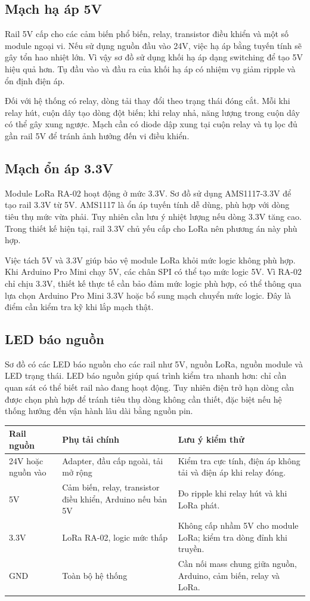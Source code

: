 \subsection{Mạch hạ áp 5V}
Rail 5V cấp cho các cảm biến phổ biến, relay, transistor điều khiển và một số module ngoại vi. Nếu sử dụng nguồn đầu vào 24V, việc hạ áp bằng tuyến tính sẽ gây tổn hao nhiệt lớn. Vì vậy sơ đồ sử dụng khối hạ áp dạng switching để tạo 5V hiệu quả hơn. Tụ đầu vào và đầu ra của khối hạ áp có nhiệm vụ giảm ripple và ổn định điện áp.

Đối với hệ thống có relay, dòng tải thay đổi theo trạng thái đóng cắt. Mỗi khi relay hút, cuộn dây tạo dòng đột biến; khi relay nhả, năng lượng trong cuộn dây có thể gây xung ngược. Mạch cần có diode dập xung tại cuộn relay và tụ lọc đủ gần rail 5V để tránh ảnh hưởng đến vi điều khiển.

\subsection{Mạch ổn áp 3.3V}
Module LoRa RA-02 hoạt động ở mức 3.3V. Sơ đồ sử dụng AMS1117-3.3V để tạo rail 3.3V từ 5V. AMS1117 là ổn áp tuyến tính dễ dùng, phù hợp với dòng tiêu thụ mức vừa phải. Tuy nhiên cần lưu ý nhiệt lượng nếu dòng 3.3V tăng cao. Trong thiết kế hiện tại, rail 3.3V chủ yếu cấp cho LoRa nên phương án này phù hợp.

Việc tách 5V và 3.3V giúp bảo vệ module LoRa khỏi mức logic không phù hợp. Khi Arduino Pro Mini chạy 5V, các chân SPI có thể tạo mức logic 5V. Vì RA-02 chỉ chịu 3.3V, thiết kế thực tế cần bảo đảm mức logic phù hợp, có thể thông qua lựa chọn Arduino Pro Mini 3.3V hoặc bổ sung mạch chuyển mức logic. Đây là điểm cần kiểm tra kỹ khi lắp mạch thật.

\subsection{LED báo nguồn}
Sơ đồ có các LED báo nguồn cho các rail như 5V, nguồn LoRa, nguồn module và LED trạng thái. LED báo nguồn giúp quá trình kiểm tra nhanh hơn: chỉ cần quan sát có thể biết rail nào đang hoạt động. Tuy nhiên điện trở hạn dòng cần được chọn phù hợp để tránh tiêu thụ dòng không cần thiết, đặc biệt nếu hệ thống hướng đến vận hành lâu dài bằng nguồn pin.

\begin{longtable}{|p{3cm}|p{4cm}|p{5.8cm}|}
\hline
\textbf{Rail nguồn} & \textbf{Phụ tải chính} & \textbf{Lưu ý kiểm thử} \\
\hline
24V hoặc nguồn vào & Adapter, đầu cấp ngoài, tải mở rộng & Kiểm tra cực tính, điện áp không tải và điện áp khi relay đóng. \\
\hline
5V & Cảm biến, relay, transistor điều khiển, Arduino nếu bản 5V & Đo ripple khi relay hút và khi LoRa phát. \\
\hline
3.3V & LoRa RA-02, logic mức thấp & Không cấp nhầm 5V cho module LoRa; kiểm tra dòng đỉnh khi truyền. \\
\hline
GND & Toàn bộ hệ thống & Cần nối mass chung giữa nguồn, Arduino, cảm biến, relay và LoRa. \\
\hline
\end{longtable}

